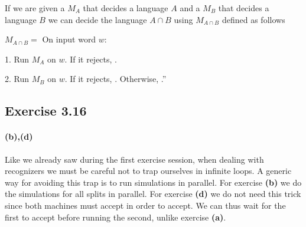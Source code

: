 If we are given a \TM{} \(M_A\) that decides a language \(A\) and
a \TM{} \(M_B\) that decides a language \(B\) we can decide the
language \(A \cap B\) using \(M_{A \cap B}\) defined as follows
\begin{TMachine}{\(M_{A \cap B} =\) On input word \(w\):}
\item[1.] Run \(M_A\) on \(w\). If it rejects, \reject.
\item[2.] Run \(M_B\) on \(w\). If it rejects, \reject. Otherwise, \accept.''
\end{TMachine}

\subsection{Exercise 3.16}
\paragraph{(b),(d)}
Like we already saw during the first exercise session, when dealing with
recognizers we must be careful not to trap ourselves in infinite loops. A
generic way for avoiding this trap is to run simulations in parallel. For
exercise \textbf{(b)} we do the simulations for all splits in
parallel. For exercise \textbf{(d)} we do not need this trick since both
machines must accept in order to accept. We can thus wait for the first to
accept before running the second, unlike exercise \textbf{(a)}.
